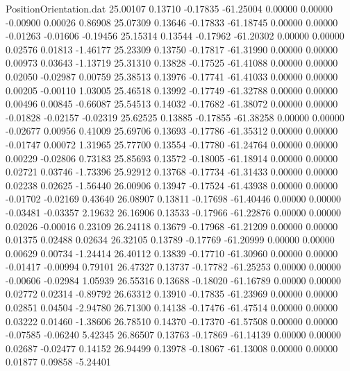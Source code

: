 \begin{filecontents}{PositionOrientation.dat}
  25.00107    0.13710   -0.17835   -61.25004    0.00000    0.00000   -0.00900    0.00026    0.86908
  25.07309    0.13646   -0.17833   -61.18745    0.00000    0.00000   -0.01263   -0.01606   -0.19456
  25.15314    0.13544   -0.17962   -61.20302    0.00000    0.00000    0.02576    0.01813   -1.46177
  25.23309    0.13750   -0.17817   -61.31990    0.00000    0.00000    0.00973    0.03643   -1.13719
  25.31310    0.13828   -0.17525   -61.41088    0.00000    0.00000    0.02050   -0.02987    0.00759
  25.38513    0.13976   -0.17741   -61.41033    0.00000    0.00000    0.00205   -0.00110    1.03005
  25.46518    0.13992   -0.17749   -61.32788    0.00000    0.00000    0.00496    0.00845   -0.66087
  25.54513    0.14032   -0.17682   -61.38072    0.00000    0.00000   -0.01828   -0.02157   -0.02319
  25.62525    0.13885   -0.17855   -61.38258    0.00000    0.00000   -0.02677    0.00956    0.41009
  25.69706    0.13693   -0.17786   -61.35312    0.00000    0.00000   -0.01747    0.00072    1.31965
  25.77700    0.13554   -0.17780   -61.24764    0.00000    0.00000    0.00229   -0.02806    0.73183
  25.85693    0.13572   -0.18005   -61.18914    0.00000    0.00000    0.02721    0.03746   -1.73396
  25.92912    0.13768   -0.17734   -61.31433    0.00000    0.00000    0.02238    0.02625   -1.56440
  26.00906    0.13947   -0.17524   -61.43938    0.00000    0.00000   -0.01702   -0.02169    0.43640
  26.08907    0.13811   -0.17698   -61.40446    0.00000    0.00000   -0.03481   -0.03357    2.19632
  26.16906    0.13533   -0.17966   -61.22876    0.00000    0.00000    0.02026   -0.00016    0.23109
  26.24118    0.13679   -0.17968   -61.21209    0.00000    0.00000    0.01375    0.02488    0.02634
  26.32105    0.13789   -0.17769   -61.20999    0.00000    0.00000    0.00629    0.00734   -1.24414
  26.40112    0.13839   -0.17710   -61.30960    0.00000    0.00000   -0.01417   -0.00994    0.79101
  26.47327    0.13737   -0.17782   -61.25253    0.00000    0.00000   -0.00606   -0.02984    1.05939
  26.55316    0.13688   -0.18020   -61.16789    0.00000    0.00000    0.02772    0.02314   -0.89792
  26.63312    0.13910   -0.17835   -61.23969    0.00000    0.00000    0.02851    0.04504   -2.94780
  26.71300    0.14138   -0.17476   -61.47514    0.00000    0.00000    0.03222    0.01460   -1.38606
  26.78510    0.14370   -0.17370   -61.57508    0.00000    0.00000   -0.07585   -0.06240    5.42345
  26.86507    0.13763   -0.17869   -61.14139    0.00000    0.00000    0.02687   -0.02477    0.14152
  26.94499    0.13978   -0.18067   -61.13008    0.00000    0.00000    0.01877    0.09858   -5.24401

\end{filecontents}
